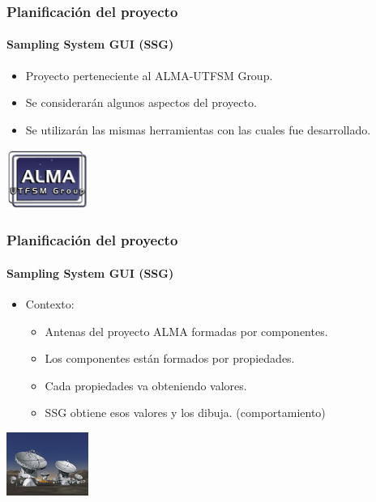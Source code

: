 \begin{frame}
\frametitle{Planificación del proyecto}
\framesubtitle{Sampling System GUI (SSG)}
\begin{itemize}
    \item Proyecto perteneciente al ALMA-UTFSM Group.
	\item Se considerarán algunos aspectos del proyecto.
	\item Se utilizarán las mismas herramientas con las cuales fue desarrollado.
\end{itemize}
\begin{center}
	\includegraphics[width=0.2\textwidth]{img/alma}
\end{center}
\end{frame}

\begin{frame}
\frametitle{Planificación del proyecto}
\framesubtitle{Sampling System GUI (SSG)}
\begin{itemize}
    \item Contexto:
	\begin{itemize}
		\item Antenas del proyecto ALMA formadas por componentes.
		\item Los componentes están formados por propiedades.
		\item Cada propiedades va obteniendo valores.
		\item SSG obtiene esos valores y los dibuja. (comportamiento)
	\end{itemize}
\end{itemize}
\begin{center}
	\includegraphics[width=0.2\textwidth]{img/antena}
\end{center}
\end{frame}

